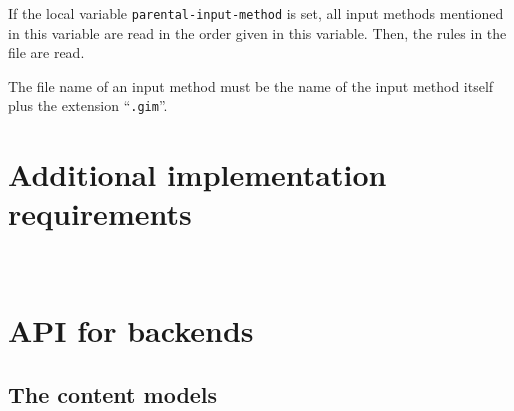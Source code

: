\documentclass[12pt,openany]{book}
\begin{document}
If the local variable \verb|parental-input-method| is set, all input methods
mentioned in this variable are read in the order given in this variable.  Then,
the rules in the file are read.

The file name of an input method must be the name of the input method itself
plus the extension ``\verb|.gim|''.

\section{Additional implementation requirements}

~

\section{API for backends}

\subsection{The content models}

\makeatletter
\newcommand*{\contentmodel}[3]{\bigskip\bigskip\begingroup\par\noindent
  \fbox{\vbox{\raggedright\parindent0pt\hangafter1\hangindent1em
      \emph{Content model of} \texttt{\textbf{#1}}:\quad
      \texttt{#2}%
      \ifx#3\@empty\else\par\hangafter1\hangindent1em
      \emph{Further constraints}:\quad#3\par\fi}}\par
  \endgroup\vspace*{1ex}\par\noindent\ignorespaces}
\newenvironment{attributes}[1][Attributes]{\noindent\emph{#1:}\vspace*{-1ex}\begin{description*}}{\end{description*}}
\newcommand{\attribute}[3]{\item[\texttt{#1} \textmd{(#2)}]\hskip0.5em #3}
\newenvironment{key-values}{\vspace*{-0.8ex}\begin{description*}}{\end{description*}}
\newcommand{\keyvalue}[3]{\item[\texttt{#1} \textmd{(#2)}]\hskip0.5em #3}
\makeatother
\newcommand{\rep}{\raisebox{-0.3ex}{\kern0.1em*}}
\newcommand{\opt}{\kern0.1em?}
\newcommand{\repp}{\kern0.1em+}
\end{document}
